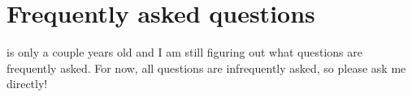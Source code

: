 \section{Frequently asked questions}
\grackle{} is only a couple years old and I am still figuring out what questions are frequently asked.
For now, all questions are infrequently asked, so please ask me directly!


